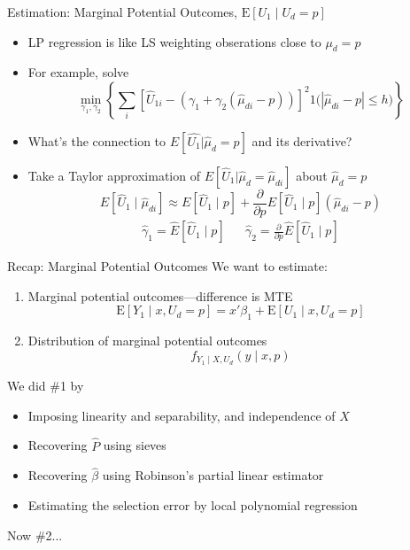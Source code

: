 \documentclass{beamer}
\begin{document}
\begin{frame}{Estimation:  Marginal Potential Outcomes,
    $\mathrm{E}[U_1\mid U_d=p]$}
  \begin{itemize}
    \item LP regression is like LS weighting obserations close to ${\mu}_d=p$ \pause
\item For example, solve
  \begin{equation*}
   \min_{\gamma_1,\gamma_2} \left\{ \sum_i\left[\hat{U}_{1i}-(\gamma_1 +
      \gamma_2(\hat{\mu}_{di}-p))\right]^2\mathrm{1}{\bigl(|\hat{\mu}_{di} - p| \le h\bigr)}\right\}
  \end{equation*} \pause
\item What's the connection to $E[\hat{U_1}|\hat{\mu}_d=p]$ and its derivative? \pause 
\item Take a Taylor approximation of $E[\hat{U}_{1}| \hat{\mu}_{d}=\hat{\mu}_{di}]$
  about $\hat{\mu}_d = p$
  \begin{equation*}
    E[\hat{U}_{1}\mid \hat{\mu}_{di}] \approx E[\hat{U}_{1}\mid p] +
    \frac{\partial}{\partial p} E[\hat{U}_{1}\mid p] (\hat{\mu}_{di}-p)
  \end{equation*} \pause
\begin{eqnarray*}
  \hat{\gamma}_1 = \hat{E}[\hat{U}_{1}\mid p] & & \hat{\gamma}_2 = \frac{\partial}{\partial p} \hat{E}[\hat{U}_{1}\mid p]
\end{eqnarray*}
  \end{itemize}
\end{frame}

\begin{frame}{Recap:  Marginal Potential Outcomes}
We want to estimate:
\begin{enumerate}
\item Marginal potential outcomes---difference is MTE
\begin{equation*}
  \mathrm{E}[Y_1\mid x,U_d=p] = x'\beta_1 +
  \mathrm{E}[U_1\mid x,U_d=p]
\end{equation*}
\item Distribution of marginal potential outcomes
  \begin{equation*}
    f_{Y_1\mid X,U_d}(y\mid x,p)
  \end{equation*}
\end{enumerate}

We did \#1 by
\begin{itemize}
\item Imposing linearity and separability, and independence of $X$
\item Recovering $\hat{P}$ using sieves
\item Recovering $\hat{\beta}$ using Robinson's partial linear
  estimator
\item Estimating the selection error by local polynomial regression
\end{itemize}
Now \#2...

\end{frame}
\end{document}

